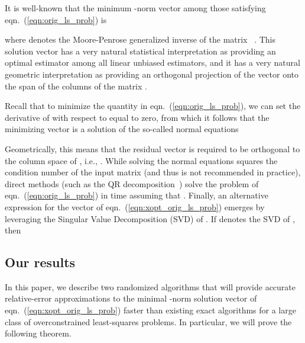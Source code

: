 \documentclass[11pt]{article}
\begin{document}
It is well-known that the minimum -norm vector among those satisfying eqn.~(\ref{eqn:orig_ls_prob}) is

where  denotes the Moore-Penrose generalized inverse of the matrix ~\cite{BIG03,GVL96}. This solution vector has a very natural statistical interpretation as providing an optimal estimator among all linear unbiased estimators, and it has a very natural geometric interpretation as providing an orthogonal projection of the vector  onto the span of the columns of the matrix .

Recall that to minimize the quantity in eqn.~(\ref{eqn:orig_ls_prob}), we can set the derivative of  with respect to  equal to zero, from which it follows that the minimizing vector  is a solution of the so-called normal equations

Geometrically, this means that the residual vector  is required to be orthogonal to the column space of , i.e., . While solving the normal equations squares the condition number of the input matrix (and thus is not recommended in practice), direct methods (such as the QR decomposition~\cite{GVL96}) solve the problem of eqn.~(\ref{eqn:orig_ls_prob}) in  time assuming that . Finally, an alternative expression for the vector  of eqn.~(\ref{eqn:xopt_orig_ls_prob}) emerges by leveraging the Singular Value Decomposition (SVD) of . If  denotes the SVD of , then



\subsection{Our results}\label{sxn:intro:ourresults}

In this paper, we describe two randomized algorithms that will provide accurate relative-error approximations to the minimal -norm solution vector  of eqn.~(\ref{eqn:xopt_orig_ls_prob}) faster than existing exact algorithms for a large class of overconstrained least-squares problems. In particular, we will prove the following theorem.
\end{document}
